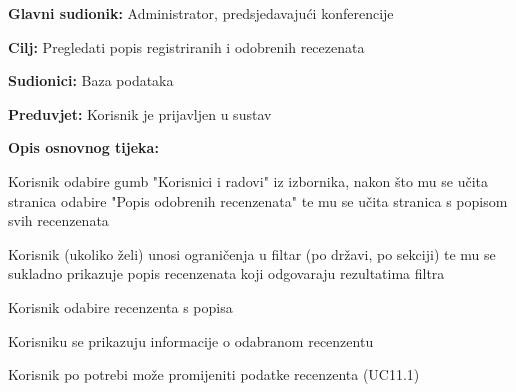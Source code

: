 					
					\noindent {}
					\begin{packed_item}
						
						\item \textbf{Glavni sudionik: } Administrator, predsjedavajući konferencije
						\item  \textbf{Cilj:} Pregledati popis registriranih i odobrenih recezenata
						\item  \textbf{Sudionici:} Baza podataka
						\item  \textbf{Preduvjet:} Korisnik je prijavljen u sustav
						\item  \textbf{Opis osnovnog tijeka:}
						
						\item[] \begin{packed_enum}
							
							\item Korisnik odabire gumb "Korisnici i radovi" iz izbornika, nakon što mu se učita stranica odabire "Popis odobrenih recenzenata" te mu se učita stranica s popisom svih recenzenata
							\item Korisnik (ukoliko želi) unosi ograničenja u filtar (po državi, po sekciji) te mu se sukladno prikazuje popis recenzenata koji odgovaraju rezultatima filtra
							\item Korisnik odabire recenzenta s popisa
							\item Korisniku se prikazuju informacije o odabranom recenzentu
							\item Korisnik po potrebi može promijeniti podatke recenzenta (UC11.1)
							
							
						\end{packed_enum}
						
					\end{packed_item}
					
